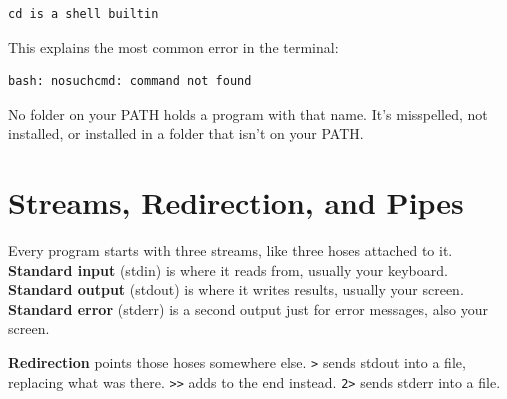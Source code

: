 \begin{codeblock}
\begin{Verbatim}[formatcom=\outputstyle]
cd is a shell builtin
\end{Verbatim}
\end{codeblock}


This explains the most common error in the terminal:

\begin{codeblock}
\begin{Verbatim}[formatcom=\outputstyle]
bash: nosuchcmd: command not found
\end{Verbatim}
\end{codeblock}

No folder on your PATH holds a program with that name. It's misspelled, not installed, or installed in a folder that isn't on your PATH.

\section{Streams, Redirection, and Pipes}\label{02-the-shell-talking-to-your-computer-in-words:streams-redirection-and-pipes}

Every program starts with three streams, like three hoses attached to it. \textbf{Standard input} (stdin) is where it reads from, usually your keyboard. \textbf{Standard output} (stdout) is where it writes results, usually your screen. \textbf{Standard error} (stderr) is a second output just for error messages, also your screen.

\textbf{Redirection} points those hoses somewhere else. \texttt{\textgreater{}} sends stdout into a file, replacing what was there. \texttt{\textgreater{}\textgreater{}} adds to the end instead. \texttt{2\textgreater{}} sends stderr into a file.

\begin{codeblock}

\begin{Shaded}
\begin{Highlighting}[]
  \OperatorTok{\textgreater{}}
  \OperatorTok{\textgreater{}\textgreater{}}
\end{Highlighting}
\end{Shaded}

\end{codeblock}

